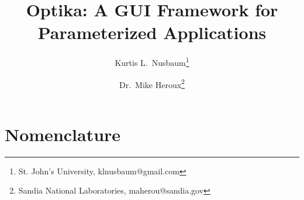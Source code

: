 \documentclass[10pt]{article}
\title{Optika: A GUI Framework for Parameterized Applications}
\author{Kurtis L.\ Nusbaum\thanks{St. John's University, klnusbaum@gmail.com} \and Dr.\ Mike Heroux\thanks{Sandia National Laboratories,
maherou@sandia.gov}}
\begin{document}
\maketitle

\begin{abstract}

\end{abstract}
\pagebreak
\tableofcontents
\pagebreak


\appendix
\section{Nomenclature}



\end{document}
